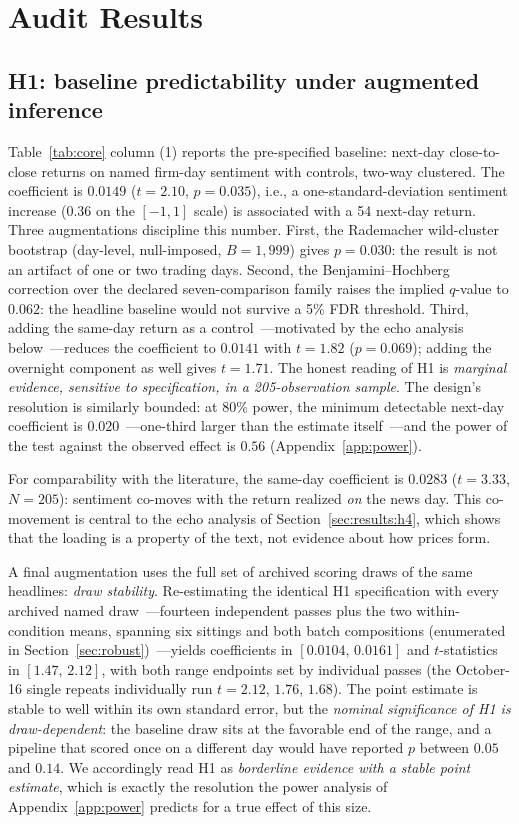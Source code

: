\section{Audit Results}\label{sec:results}

\subsection{H1: baseline predictability under augmented inference}\label{sec:results:h1}

Table~\ref{tab:core} column (1) reports the pre-specified baseline: next-day close-to-close returns on named firm-day sentiment with controls, two-way clustered. The coefficient is $0.0149$ ($t=2.10$, $p=0.035$), i.e., a one-standard-deviation sentiment increase (0.36 on the $[-1,1]$ scale) is associated with a 54 \bps{} next-day return. Three augmentations discipline this number. First, the Rademacher wild-cluster bootstrap (day-level, null-imposed, $B=1{,}999$) gives $p=0.030$: the result is not an artifact of one or two trading days. Second, the Benjamini--Hochberg correction over the declared seven-comparison family raises the implied $q$-value to $0.062$: the headline baseline would not survive a 5\% FDR threshold. Third, adding the same-day return as a control~---motivated by the echo analysis below~---reduces the coefficient to $0.0141$ with $t=1.82$ ($p=0.069$); adding the overnight component as well gives $t=1.71$. The honest reading of H1 is \emph{marginal evidence, sensitive to specification, in a 205-observation sample}. The design's resolution is similarly bounded: at 80\% power, the minimum detectable next-day coefficient is $0.020$~---one-third larger than the estimate itself~---and the power of the test against the observed effect is $0.56$ (Appendix~\ref{app:power}).

For comparability with the literature, the same-day coefficient is $0.0283$ ($t=3.33$, $N=205$): sentiment co-moves with the return realized \emph{on} the news day. This co-movement is central to the echo analysis of Section~\ref{sec:results:h4}, which shows that the loading is a property of the text, not evidence about how prices form.

A final augmentation uses the full set of archived scoring draws of the same headlines: \emph{draw stability}. Re-estimating the identical H1 specification with every archived named draw~---fourteen independent passes plus the two within-condition means, spanning six sittings and both batch compositions (enumerated in Section~\ref{sec:robust})~---yields coefficients in $[0.0104,\,0.0161]$ and $t$-statistics in $[1.47,\,2.12]$, with both range endpoints set by individual passes (the October-16 single repeats individually run $t=2.12$, $1.76$, $1.68$). The point estimate is stable to well within its own standard error, but the \emph{nominal significance of H1 is draw-dependent}: the baseline draw sits at the favorable end of the range, and a pipeline that scored once on a different day would have reported $p$ between $0.05$ and $0.14$. We accordingly read H1 as \emph{borderline evidence with a stable point estimate}, which is exactly the resolution the power analysis of Appendix~\ref{app:power} predicts for a true effect of this size.

